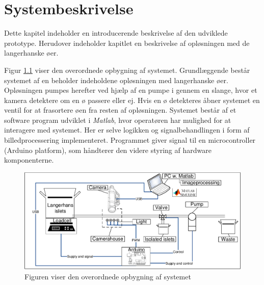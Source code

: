 \chapter{Systembeskrivelse}
Dette kapitel indeholder en introducerende beskrivelse af den udviklede prototype. Herudover indeholder kapitlet en beskrivelse af opløsningen med de langerhanske øer.

Figur \ref{fig:system} viser den overordnede opbygning af systemet. Grundlæggende består systemet af en beholder indeholdene opløsningen med langerhanske øer. Opløsningen pumpes herefter ved hjælp af en pumpe i gennem en slange, hvor et kamera detektere om en ø passere eller ej. Hvis en ø detekteres åbner systemet en ventil for at frasortere øen fra resten af opløsningen. Systemet består af et software program udviklet i \textit{Matlab}, hvor operatøren har mulighed for at interagere med systemet. Her er selve logikken og signalbehandlingen i form af billedprocessering implementeret. Programmet giver signal til en microcontroller (Arduino platform), som håndterer den videre styring af hardware komponenterne.

\begin{figure}[H]
	\centering
	\includegraphics[width=1\textwidth]{billeder/DMTS.pdf}
	\caption{Figuren viser den overordnede opbygning af systemet}
	\label{fig:system}
\end{figure}
%
%


